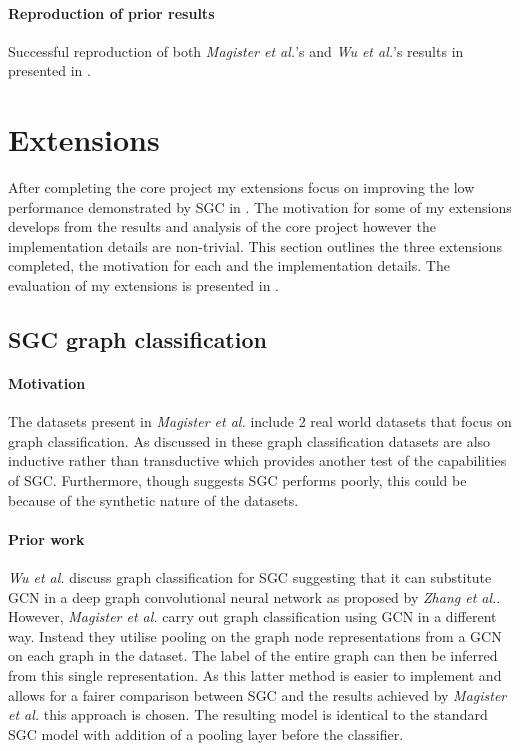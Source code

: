 \paragraph{Reproduction of prior results}
Successful reproduction of both \textit{Magister et al.}\cite{magister2021gcexplainer}'s and \textit{Wu et al.}\cite{wu2019simplifying}'s results in presented in .

\section{Extensions}
\label{sec:extensions-imp}
After completing the core project my extensions focus on improving the low performance demonstrated by SGC in .
The motivation for some of my extensions develops from the results and analysis of the core project however the implementation details are non-trivial.
This section outlines the three extensions completed, the motivation for each and the implementation details.
The evaluation of my extensions is presented in .

\subsection{SGC graph classification}
\paragraph{Motivation}
The datasets present in \textit{Magister et al.}\cite{magister2021gcexplainer} include 2 real world datasets that focus on graph classification.
As discussed in  these graph classification datasets are also inductive rather than transductive which provides another test of the capabilities of SGC.
Furthermore, though  suggests SGC performs poorly, this could be because of the synthetic nature of the datasets.

\paragraph{Prior work}
\textit{Wu et al.}\cite{wu2019simplifying} discuss graph classification for SGC suggesting that it can substitute GCN in a deep graph convolutional neural network as proposed by \textit{Zhang et al.}\cite{zhang2018end}.
However, \textit{Magister et al.} carry out graph classification using GCN in a different way.
Instead they utilise pooling on the graph node representations from a GCN on each graph in the dataset.
The label of the entire graph can then be inferred from this single representation.
As this latter method is easier to implement and allows for a fairer comparison between SGC and the results achieved by \textit{Magister et al.} this approach is chosen.
The resulting model is identical to the standard SGC model with addition of a pooling layer before the classifier.

